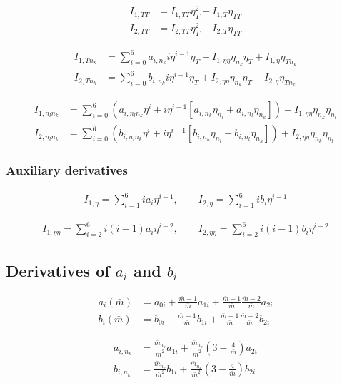 \documentclass[english]{../thermomemo/thermomemo}
\newcommand{\lp}{\left(}
\newcommand{\rp}{\right)}
\begin{document}
\begin{align}
  I_{1,TT} &= I_{1,T T} \eta_{T}^2 + I_{1,T} \eta_{TT} \\
  I_{2,TT} &= I_{2,T T} \eta_{T}^2 + I_{2,T} \eta_{TT}
\end{align}

\begin{align}
  I_{1,T n_k} &= \sum_{i=0}^6 a_{i,n_k} i \eta^{i-1} \eta_T + I_{1,\eta\eta} \eta_{n_k} \eta_T + I_{1,\eta} \eta_{T n_k} \\
  I_{2,T n_k} &= \sum_{i=0}^6 b_{i,n_k} i \eta^{i-1} \eta_T + I_{2,\eta\eta} \eta_{n_k} \eta_T + I_{2,\eta} \eta_{T n_k}
\end{align}

\begin{align}
  I_{1,n_l n_k} &= \sum_{i=0}^6 (a_{i,n_l n_k} \eta^i + i \eta^{i-1} [a_{i,n_k} \eta_{n_l} + a_{i,n_l} \eta_{n_k}]) + I_{1,\eta\eta} \eta_{n_k} \eta_{n_l} \\
  I_{2,n_l n_k} &= \sum_{i=0}^6 (b_{i,n_l n_k} \eta^i + i \eta^{i-1} [b_{i,n_k} \eta_{n_l} + b_{i,n_l} \eta_{n_k}]) + I_{2,\eta\eta} \eta_{n_k} \eta_{n_l}
\end{align}

\subsubsection*{Auxiliary derivatives}
\begin{align}
  I_{1,\eta} = \sum_{i=1}^6 i a_{i} \eta^{i-1}, \qquad I_{2,\eta} = \sum_{i=1}^6 i b_{i} \eta^{i-1}
\end{align}

\begin{align}
  I_{1,\eta\eta} = \sum_{i=2}^6 i (i-1) a_{i} \eta^{i-2}, \qquad I_{2,\eta\eta} = \sum_{i=2}^6 i (i-1) b_{i} \eta^{i-2}
\end{align}


\subsection{Derivatives of $a_i$ and $b_i$}
\begin{align}
  a_i(\bar m) &= a_{0i} + \frac{\bar m -1}{\bar m}a_{1i} + \frac{\bar m -1}{\bar m} \frac{\bar m -2}{\bar m}a_{2i} \\
  b_i(\bar m) &= b_{0i} + \frac{\bar m -1}{\bar m}b_{1i} + \frac{\bar m -1}{\bar m} \frac{\bar m -2}{\bar m}b_{2i}
\end{align}

\begin{align}
  a_{i,n_k} &= \frac{\bar m_{n_k}}{\bar m^2} a_{1i} + \frac{\bar m_{n_k}}{\bar m^2} \lp 3- \frac{4}{\bar m}\rp a_{2i} \\
  b_{i,n_k} &= \frac{\bar m_{n_k}}{\bar m^2} b_{1i} + \frac{\bar m_{n_k}}{\bar m^2} \lp 3- \frac{4}{\bar m}\rp b_{2i}
\end{align}
\end{document}
